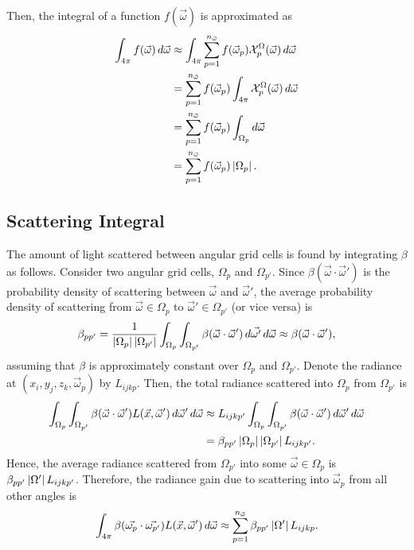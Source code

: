 Then, the integral of a function $f(\vec{\omega})$ is approximated as
\begin{align*}
  \int_{4\pi} f(\vec{\omega})\, d\vec{\omega} &\approx \int_{4\pi} \sum_{p=1}^{n_{\vec{\omega}}} f(\vec{\omega}_p) \mathcal{X}^\Omega_p(\vec{\omega})\, d\vec{\omega} \\
  &= \sum_{p=1}^{n_{\vec{\omega}}} f(\vec{\omega}_p) \int_{4\pi} \mathcal{X}^\Omega_p(\vec{\omega})\, d\vec{\omega} \\
  &= \sum_{p=1}^{n_{\vec{\omega}}} f(\vec{\omega}_p) \int_{\Omega_p} d\vec{\omega} \\
  &= \sum_{p=1}^{n_{\vec{\omega}}} f(\vec{\omega}_p) \left| \Omega_p \right|.
\end{align*}

\subsection{Scattering Integral}
\label{sec:scatter_integral}

The amount of light scattered between angular grid cells is found by integrating $\beta$ as follows.
Consider two angular grid cells, $\Omega_p$ and $\Omega_{p'}$.
Since $\beta(\vec{\omega}\cdot\vec{\omega}')$ is the probability density of scattering between $\vec{\omega}$ and $\vec{\omega}'$, the average probability density of scattering from $\vec{\omega} \in \Omega_p$ to $\vec{\omega}' \in \Omega_{p'}$ (or vice versa) is
\begin{equation*}
  \beta_{pp'} = \frac{1}{\left| \Omega_p \right|\left| \Omega_{p'} \right|} \int_{\Omega_p}\int_{\Omega_{p'}}\beta(\vec{\omega}\cdot\vec{\omega}')\, d\vec{\omega'}\, d\vec{\omega} \approx \beta(\vec{\omega}\cdot\vec{\omega}'),
\end{equation*}
assuming that $\beta$ is approximately constant over $\Omega_p$ and $\Omega_{p'}$.
Denote the radiance at $(x_i, y_j, z_k, \vec{\omega}_p)$ by $L_{ijkp}$.
Then, the total radiance scattered into $\Omega_p$ from $\Omega_{p'}$ is
\begin{align*}
  \int_{\Omega_p}\int_{\Omega_{p'}}\beta(\vec{\omega} \cdot \vec{\omega}')L(\vec{x},\vec{\omega}')\, d\vec{\omega}'\, d\vec{\omega}
  &\approx L_{ijkp'} \int_{\Omega_p}\int_{\Omega_{p'}} \beta(\vec{\omega} \cdot \vec{\omega}')\, d\vec{\omega}'\, d\vec{\omega} \\
  &= \beta_{pp'}\left| \Omega_p \right|\left| \Omega_{p'} \right|L_{ijkp'}.
\end{align*}
Hence, the average radiance scattered from $\Omega_{p'}$ into some $\vec{\omega} \in \Omega_p$ is $\beta_{pp'}\left| \Omega' \right|L_{ijkp'}$.
Therefore, the radiance gain due to scattering into $\vec{\omega}_p$ from all other angles is
\begin{equation}
  \int_{4\pi}\beta(\vec{\omega_p}\cdot\vec{\omega_{p'}})L(\vec{x}, \vec{\omega}')\, d\vec{\omega} \approx \sum_{p=1}^{n_{\vec{\omega}}} \beta_{pp'}\left| \Omega' \right|L_{ijkp}.
  \label{eqn:scatter_integral}
\end{equation}

